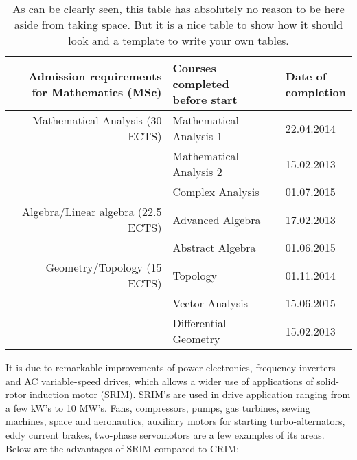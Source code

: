 \begin{table}
  \begin{tabular}{rll} \toprule
    \parbox[t]{5cm}{\textbf{Admission requirements                            \\ for Mathematics (MSc)}}  & \parbox[t]{5cm}{\textbf{Courses completed \\ before start}} & \parbox[t]{2.5cm}{\textbf{Date of \\ completion}} \\  \midrule
    Mathematical Analysis (30 ECTS)    & Mathematical Analysis 1 & 22.04.2014 \\
    ~                                  & Mathematical Analysis 2 & 15.02.2013 \\
    ~                                  & Complex Analysis        & 01.07.2015 \\ \midrule
    Algebra/Linear algebra (22.5 ECTS) & Advanced Algebra        & 17.02.2013 \\
    ~                                  & Abstract Algebra        & 01.06.2015 \\ \midrule
    Geometry/Topology (15 ECTS)        & Topology                & 01.11.2014 \\
    ~                                  & Vector Analysis         & 15.06.2015 \\
    ~                                  & Differential Geometry   & 15.02.2013 \\ \bottomrule
  \end{tabular}
  \caption{As can be clearly seen, this table has absolutely no reason to be here aside from
    taking space. But it is a nice table to show how it should look and a template to write your
    own tables.}
\end{table}

It is due to remarkable improvements of power electronics, frequency inverters and AC
variable-speed drives, which allows a wider use of applications of solid-rotor induction motor
(SRIM). SRIM's are used in drive application ranging from a few kW's to 10 MW's. Fans,
compressors, pumps, gas turbines, sewing machines, space and aeronautics, auxiliary motors for
starting turbo-alternators, eddy current brakes, two-phase servomotors are a few examples of its
areas. \\

Below are the advantages of SRIM compared to CRIM:


